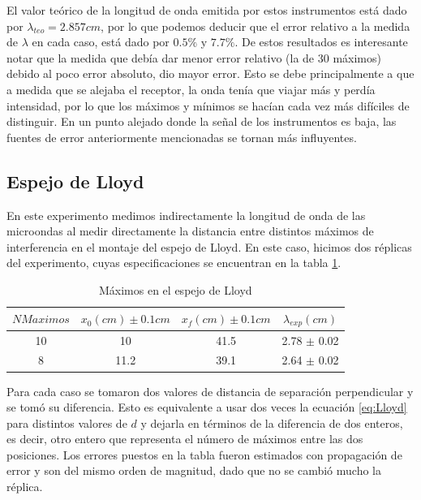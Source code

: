\documentclass[%
 reprint,
 amsmath,amssymb,
 aps,
]{revtex4-1}
\begin{document}
El valor teórico de la longitud de onda emitida por estos instrumentos está dado por $\lambda_{teo} = 2.857 cm$, por lo que podemos deducir que el error relativo a la medida de $\lambda$ en cada caso, está dado por $0.5\%$ y $7.7\%$. De estos resultados es interesante notar que la medida que debía dar menor error relativo (la de 30 máximos) debido al poco error absoluto, dio mayor error. Esto se debe principalmente a que a medida que se alejaba el receptor, la onda tenía que viajar más y perdía intensidad, por lo que los máximos y mínimos se hacían cada vez más difíciles de distinguir. En un punto alejado donde la señal de los instrumentos es baja, las fuentes de error anteriormente mencionadas se tornan más influyentes.\\

\subsection{\label{sec:level3}Espejo de Lloyd}
En este experimento medimos indirectamente la longitud de onda de las microondas al medir directamente la distancia entre distintos máximos de interferencia en el montaje del espejo de Lloyd. En este caso, hicimos dos réplicas del experimento, cuyas especificaciones se encuentran en la tabla \ref{table:Lloyd}.\\

\begin{table}[h!]
\centering
 \begin{tabular}{|c|c|c|c|} 
 \hline
 $N Maximos$& $x_0(cm) \pm 0.1cm$ & $x_f(cm) \pm 0.1cm$ & $\lambda_{exp} (cm)$ \\ [0.5ex] 
 \hline\hline
 10 & 10 & 41.5 & 2.78 $\pm$ 0.02\\
 8 & 11.2 & 39.1 & 2.64 $\pm$ 0.02\\
[1ex] 
 \hline
 \end{tabular}
 \caption{Máximos en el espejo de Lloyd}
 \label{table:Lloyd}
\end{table}

Para cada caso se tomaron dos valores de distancia de separación perpendicular y se tomó su diferencia. Esto es equivalente a usar dos veces la ecuación \ref{eq:Lloyd} para distintos valores de $d$ y dejarla en términos de la diferencia de dos enteros, es decir, otro entero que representa el número de máximos entre las dos posiciones. Los errores puestos en la tabla fueron estimados con propagación de error y son del mismo orden de magnitud, dado que no se cambió mucho la réplica.\\
\end{document}
